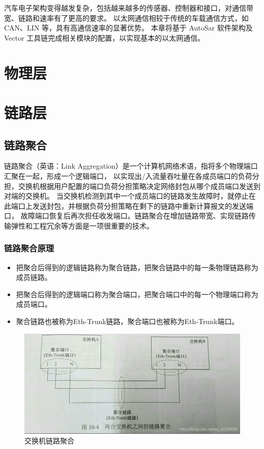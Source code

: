汽车电子架构变得越发复杂，包括越来越多的传感器、控制器和接口，对通信带宽、链路和速率有了更高的要求。
以太网通信相较于传统的车载通信方式，如 CAN、LIN 等，具有高通信速率的显著优势。
本章将基于 AutoSar 软件架构及 Vector 工具链完成相关模块的配置，以实现基本的以太网通信。

\section{物理层}

\section{链路层}

\subsection{链路聚合}
链路聚合\cite{Link_Aggregation}（英语：Link Aggregation）是一个计算机网络术语，指将多个物理端口汇聚在一起，形成一个逻辑端口，
以实现出/入流量吞吐量在各成员端口的负荷分担，交换机根据用户配置的端口负荷分担策略决定网络封包从哪个成员端口发送到对端的交换机。
当交换机检测到其中一个成员端口的链路发生故障时，就停止在此端口上发送封包，并根据负荷分担策略在剩下的链路中重新计算报文的发送端口，
故障端口恢复后再次担任收发端口。链路聚合在增加链路带宽、实现链路传输弹性和工程冗余等方面是一项很重要的技术。

\subsubsection{链路聚合原理}

\begin{itemize}
    \item 把聚合后得到的逻辑链路称为聚合链路，把聚合链路中的每一条物理链路称为成员链路。
    \item 把聚合后得到的逻辑端口称为聚合端口，把聚合端口中的每一个物理端口称为成员端口。
    \item 聚合链路也被称为Eth-Trunk链路，聚合端口也被称为Eth-Trunk端口。
\end{itemize}

\begin{figure}[ht]
    \centering
    \includegraphics[scale=0.5]{pic/20190414170741211.jpg}
    \caption{交换机链路聚合}
    \label{fig:switch_link_aggre}
\end{figure}

